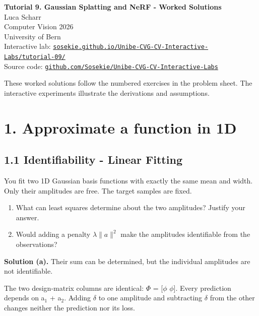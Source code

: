 \documentclass[11pt,a4paper]{article}
\begin{document}
\begin{center}
{\Large\bfseries Tutorial 9. Gaussian Splatting and NeRF - Worked Solutions}\\[2mm]
Luca Scharr\\
Computer Vision 2026\\
University of Bern\\[1mm]
Interactive lab: \href{https://sosekie.github.io/Unibe-CVG-CV-Interactive-Labs/tutorial-09/}{\nolinkurl{sosekie.github.io/Unibe-CVG-CV-Interactive-Labs/tutorial-09/}}\\
Source code: \href{https://github.com/Sosekie/Unibe-CVG-CV-Interactive-Labs}{\nolinkurl{github.com/Sosekie/Unibe-CVG-CV-Interactive-Labs}}
\end{center}

These worked solutions follow the numbered exercises in the problem sheet.
The interactive experiments illustrate the derivations and assumptions.
\par{}\section*{1. Approximate a function in 1D}
\subsection*{1.1 Identifiability - Linear Fitting}
You fit two 1D Gaussian basis functions with exactly the same mean and width.
Only their amplitudes are free.
The target samples are fixed.
\begin{enumerate}[label=(\alph*),nosep]
\item What can least squares determine about the two amplitudes?
Justify your answer.
\item Would adding a penalty $\lambda\|a\|^2$ make the amplitudes identifiable from the observations?
\end{enumerate}
\noindent\textbf{Solution (a).} Their sum can be determined, but the individual amplitudes are not identifiable.

The two design-matrix columns are identical: $\Phi$ = [$\phi$ $\phi$].
Every prediction depends on a${}_1$ + a${}_2$.
Adding $\delta$ to one amplitude and subtracting $\delta$ from the other changes neither the prediction nor its loss.
\end{document}
